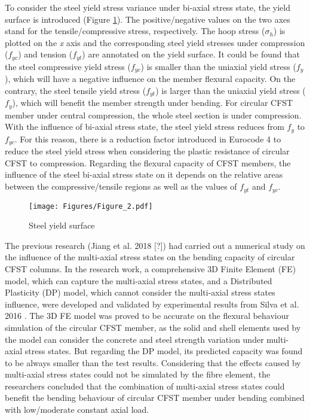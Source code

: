 \documentclass[12pt,a4]{article}
\begin{document}
	To consider the steel yield stress variance under bi-axial stress state, the yield surface is introduced (Figure \ref{fig-2}). The positive/negative values on the two axes stand for the tensile/compressive stress, respectively. The hoop stress ($\sigma_h$) is plotted on the \textit{x} axis and the corresponding steel yield stresses under compression ($f_{yc}$) and tension ($f_{yt}$) are annotated on the yield surface. It could be found that the steel compressive yield stress ($f_{yc}$) is smaller than the uniaxial yield stress ($f_y$), which will have a negative influence on the member flexural capacity. On the contrary, the steel tensile yield stress ($f_{yt}$) is larger than the uniaxial yield stress ($f_y$), which will benefit the member strength under bending. For circular CFST member under central compression, the whole steel section is under compression. With the influence of bi-axial stress state, the steel yield stress reduces from $f_y$ to $f_{yc}$. For this reason, there is a reduction factor introduced in Eurocode 4 \cite{RN64} to reduce the steel yield stress when considering the plastic resistance of circular CFST to compression. Regarding the flexural capacity of CFST members, the influence of the steel bi-axial stress state on it depends on the relative areas between the compressive/tensile regions as well as the values of $f_{yt}$ and $f_{yc}$.
	\par
	\begin{figure}[h]
		\centering
		\texttt{[image: Figures/Figure\_2.pdf]}
		\caption{Steel yield surface}
		\label{fig-2}
	\end{figure}
	\par
	The previous research (Jiang et al. 2018 [?]) had carried out a numerical study on the influence of the multi-axial stress states on the bending capacity of circular CFST columns. In the research work, a comprehensive 3D Finite Element (FE) model, which can capture the multi-axial stress states, and a Distributed Plasticity (DP) model, which cannot consider the multi-axial stress states influence, were developed and validated by experimental results from Silva et al. 2016 \cite{Silva2016}. The 3D FE model was proved to be accurate on the flexural behaviour simulation of the circular CFST member, as the solid and shell elements used by the model can consider the concrete and steel strength variation under multi-axial stress states. But regarding the DP model, its predicted capacity was found to be always smaller than the test results. Considering that the effects caused by multi-axial stress states could not be simulated by the fibre element, the researchers concluded that the combination of multi-axial stress states could benefit the bending behaviour of circular CFST member under bending combined with low/moderate constant axial load.
\end{document}
